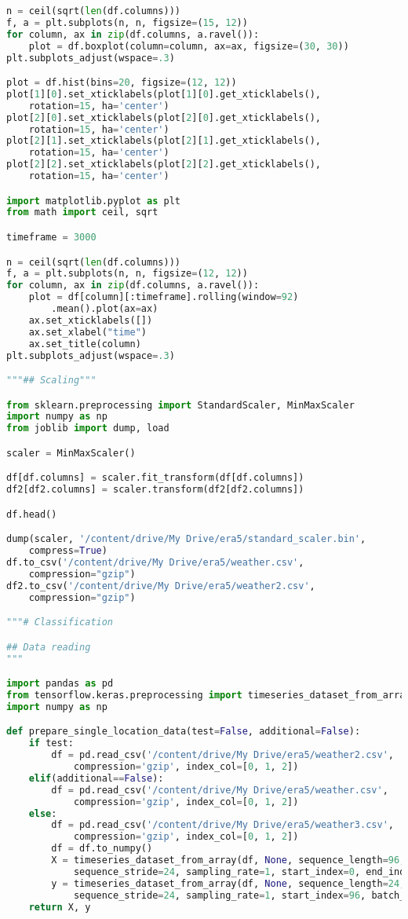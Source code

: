 \begin{lstlisting}[label=python-listing,caption={Kod źródłowy},language=python]
n = ceil(sqrt(len(df.columns)))
f, a = plt.subplots(n, n, figsize=(15, 12))
for column, ax in zip(df.columns, a.ravel()):
    plot = df.boxplot(column=column, ax=ax, figsize=(30, 30))
plt.subplots_adjust(wspace=.3)

plot = df.hist(bins=20, figsize=(12, 12))
plot[1][0].set_xticklabels(plot[1][0].get_xticklabels(), 
    rotation=15, ha='center')
plot[2][0].set_xticklabels(plot[2][0].get_xticklabels(), 
    rotation=15, ha='center')
plot[2][1].set_xticklabels(plot[2][1].get_xticklabels(), 
    rotation=15, ha='center')
plot[2][2].set_xticklabels(plot[2][2].get_xticklabels(), 
    rotation=15, ha='center')

import matplotlib.pyplot as plt
from math import ceil, sqrt

timeframe = 3000

n = ceil(sqrt(len(df.columns)))
f, a = plt.subplots(n, n, figsize=(12, 12))
for column, ax in zip(df.columns, a.ravel()):
    plot = df[column][:timeframe].rolling(window=92)
        .mean().plot(ax=ax)
    ax.set_xticklabels([])
    ax.set_xlabel("time")
    ax.set_title(column)
plt.subplots_adjust(wspace=.3)

"""## Scaling"""

from sklearn.preprocessing import StandardScaler, MinMaxScaler
import numpy as np
from joblib import dump, load

scaler = MinMaxScaler()

df[df.columns] = scaler.fit_transform(df[df.columns])
df2[df2.columns] = scaler.transform(df2[df2.columns])

df.head()

dump(scaler, '/content/drive/My Drive/era5/standard_scaler.bin', 
    compress=True)
df.to_csv('/content/drive/My Drive/era5/weather.csv', 
    compression="gzip")
df2.to_csv('/content/drive/My Drive/era5/weather2.csv', 
    compression="gzip")

"""# Classification

## Data reading
"""

import pandas as pd
from tensorflow.keras.preprocessing import timeseries_dataset_from_array
import numpy as np

def prepare_single_location_data(test=False, additional=False):
    if test:
        df = pd.read_csv('/content/drive/My Drive/era5/weather2.csv', 
            compression='gzip', index_col=[0, 1, 2])
    elif(additional==False):
        df = pd.read_csv('/content/drive/My Drive/era5/weather.csv', 
            compression='gzip', index_col=[0, 1, 2])
    else:
        df = pd.read_csv('/content/drive/My Drive/era5/weather3.csv', 
            compression='gzip', index_col=[0, 1, 2])
        df = df.to_numpy()
        X = timeseries_dataset_from_array(df, None, sequence_length=96, 
            sequence_stride=24, sampling_rate=1, start_index=0, end_index=len(df)-24, batch_size=None)
        y = timeseries_dataset_from_array(df, None, sequence_length=24, 
            sequence_stride=24, sampling_rate=1, start_index=96, batch_size=None)
    return X, y


\end{lstlisting}
